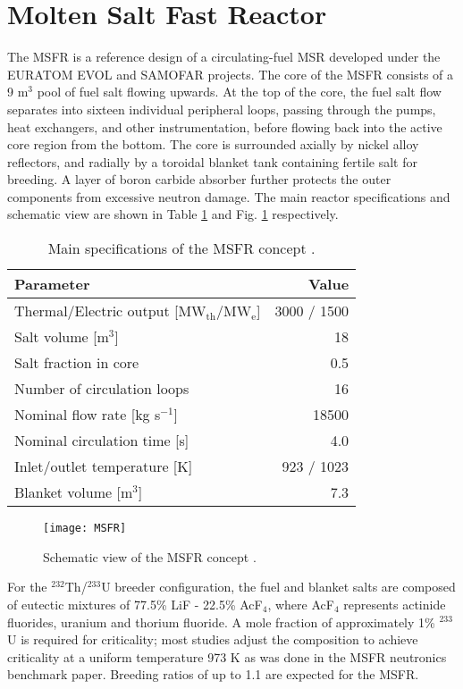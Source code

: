 \section{Molten Salt Fast Reactor}

The \gls{MSFR} is a reference design of a circulating-fuel \gls{MSR} developed
under the EURATOM \gls{EVOL} and \gls{SAMOFAR} projects. The core of the
\gls{MSFR} consists of a 9 m$^3$ pool of fuel salt flowing upwards. At the top
of the core, the fuel salt flow separates into sixteen individual peripheral
loops, passing through the pumps, heat exchangers, and other instrumentation,
before flowing back into the active core region from the bottom. The core is
surrounded axially by nickel alloy reflectors, and radially by a toroidal
blanket tank containing fertile salt for
breeding. A layer of boron carbide absorber further protects the outer
components from excessive neutron damage. The main reactor specifications and
schematic view are shown in Table \ref{table:msfr} and Fig. \ref{fig:msfr}
respectively. 

\begin{table}[h]
	\captionsetup{justification=centering}
	\caption{Main specifications of the \gls{MSFR} concept
				\cite{serp_molten_2014}.}
	\centering
	\begin{tabular}{ l r }
		\hline
		Parameter & Value \\
		\hline
		Thermal/Electric output [MW$_{\text{th}}$/MW$_{\text{e}}$] & 3000 /
		1500 
		\\
		Salt volume [m$^3$] & 18 \\
		Salt fraction in core & 0.5 \\
		Number of circulation loops & 16 \\
		Nominal flow rate [kg s$^{-1}$] & 18500  \\
		Nominal circulation time [s] & 4.0 \\
		Inlet/outlet temperature [K] & 923 / 1023 \\
		Blanket volume [m$^3$] & 7.3\\
		\hline
	\end{tabular}
	\label{table:msfr}
\end{table}

\begin{figure}[h] 
	\centering
	\texttt{[image: MSFR]}
	\caption{Schematic view of the MSFR concept \cite{serp_molten_2014}.}
	\label{fig:msfr}
\end{figure}

For the $^{232}$Th/$^{233}$U breeder configuration, the fuel and blanket salts
are composed of eutectic mixtures of 77.5\% LiF - 22.5\% AcF$_4$, where
AcF$_4$ represents actinide fluorides, uranium and thorium fluoride. A mole
fraction of approximately 1\% $^{233}$U is required for criticality; most
studies adjust the composition to achieve criticality at a uniform temperature
973 K as was done in the \gls{MSFR} neutronics benchmark paper. Breeding
ratios of up to 1.1 are expected for the \gls{MSFR}.

